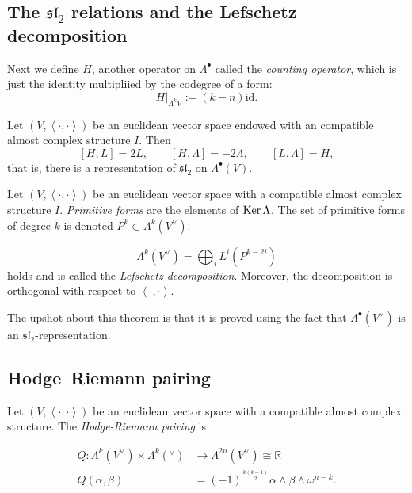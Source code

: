 \subsection{The $\mathfrak{sl}_2$ relations
and the
Lefschetz decomposition}
\label{subsection-sl2-lefschetz-decomposition}

\noindent
Next we define $H$, another operator on
$\Lambda^\bullet$
called the {\it counting operator},
which is just the identity multipliied by the
codegree of a form:
$$
H|_{\Lambda^kV}:=(k-n)\text{id}.
$$
\begin{proposition}
\label{proposition-sl2-relat-exter-algeb}
Let $(V,\left\langle{}\cdot,\cdot\right\rangle{})$ be an
euclidean vector space
endowed with an compatible almost complex
structure $I$.
Then
$$
[H,L]=2L,\qquad [H,\Lambda]=-2\Lambda,\qquad
[L,\Lambda]=H,
$$
that is, there is a representation of
$\mathfrak{sl}_2$
on $\Lambda^\bullet(V)$.
\end{proposition}

\begin{definition}
\label{definition-primitive-form}
Let $(V,\left\langle{}\cdot,\cdot\right\rangle{})$ be an
euclidean
vector space with a compatible almost complex
structure $I$.
{\it Primitive forms} are the elements of
$\mathop{\mathrm{Ker}} \Lambda$.
The set of primitive forms of degree $k$
is denoted $P^k \subset \Lambda^k(V^\vee)$.
\end{definition}

\begin{theorem}
\label{theorem-lefschetz-decomposition}
$$
\Lambda^k(V^\vee)
=
\bigoplus_i L^i(P^{k-2i})
$$
holds and is called the {\it Lefschetz
decomposition}.
Moreover, the decomposition is orthogonal
with respect to
$\left\langle{}\cdot,\cdot\right\rangle{}$.
\end{theorem}

\noindent
The upshot about this theorem
is that it is proved using the fact
that $\Lambda^\bullet(V^\vee)$ is an
$\mathfrak{sl}_2$-representation.

\subsection{Hodge--Riemann pairing}
\label{subsection-hodge-riemann-pairing}

\begin{definition}
\label{definition-hodge-riemann-pairing}
\begin{reference}
\cite[Definition 1.2.35]{huc}
\end{reference}
Let $(V,\left\langle{}\cdot,\cdot\right\rangle{})$
be an euclidean vector space with a
compatible almost complex structure.
The {\it Hodge-Riemann pairing} is

$$
\begin{aligned}
Q: \Lambda^k(V^\vee)\times \Lambda^k(^\vee)
&\longrightarrow
\Lambda^{2n}(V^\vee)\cong \mathbb{R} \\
Q(\alpha,\beta)&
=(-1)^{\frac{k(k-1)}{2}}
\alpha\wedge\beta\wedge\omega^{n-k}.
\end{aligned}
$$
\end{definition}


